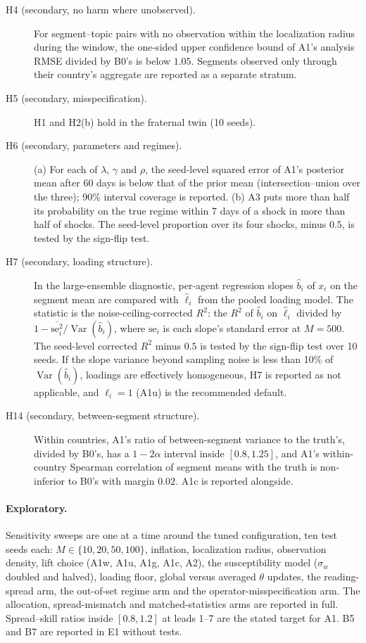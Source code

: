 \documentclass[10pt]{article}
\theoremstyle{remark}
\newcommand{\Var}{\operatorname{Var}}
\begin{document}
\begin{description}
\item[H4 (secondary, no harm where unobserved).] For segment--topic pairs with no observation within the localization radius during the window, the one-sided upper confidence bound of A1's analysis RMSE divided by B0's is below $1.05$. Segments observed only through their country's aggregate are reported as a separate stratum.
\item[H5 (secondary, misspecification).] H1 and H2(b) hold in the fraternal twin (10 seeds).
\item[H6 (secondary, parameters and regimes).] (a) For each of $\lambda$, $\gamma$ and $\rho$, the seed-level squared error of A1's posterior mean after 60 days is below that of the prior mean (intersection--union over the three); 90\% interval coverage is reported. (b) A3 puts more than half its probability on the true regime within 7 days of a shock in more than half of shocks. The seed-level proportion over its four shocks, minus $0.5$, is tested by the sign-flip test.
\item[H7 (secondary, loading structure).] In the large-ensemble diagnostic, per-agent regression slopes $\hat b_i$ of $x_i$ on the segment mean are compared with $\hat\ell_i$ from the pooled loading model. The statistic is the noise-ceiling-corrected $R^2$: the $R^2$ of $\hat b_i$ on $\hat\ell_i$ divided by $1-\overline{\mathrm{se}^2_i}/\Var(\hat b_i)$, where $\mathrm{se}_i$ is each slope's standard error at $M=500$. The seed-level corrected $R^2$ minus $0.5$ is tested by the sign-flip test over 10 seeds. If the slope variance beyond sampling noise is less than 10\% of $\Var(\hat b_i)$, loadings are effectively homogeneous, H7 is reported as not applicable, and $\ell_i=1$ (A1u) is the recommended default.
\item[H14 (secondary, between-segment structure).] Within countries, A1's ratio of between-segment variance to the truth's, divided by B0's, has a $1-2\alpha$ interval inside $[0.8,1.25]$, and A1's within-country Spearman correlation of segment means with the truth is non-inferior to B0's with margin $0.02$. A1c is reported alongside.
\end{description}
\paragraph{Exploratory.} Sensitivity sweeps are one at a time around the tuned configuration, ten test seeds each: $M\in\{10,20,50,100\}$, inflation, localization radius, observation density, lift choice (A1w, A1u, A1g, A1c, A2), the susceptibility model ($\sigma_w$ doubled and halved), loading floor, global versus averaged $\theta$ updates, the reading-spread arm, the out-of-set regime arm and the operator-misspecification arm. The allocation, spread-mismatch and matched-statistics arms are reported in full. Spread--skill ratios inside $[0.8,1.2]$ at leads 1--7 are the stated target for A1. B5 and B7 are reported in E1 without tests.
\end{document}

